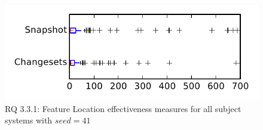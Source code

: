 
\begin{figure}
\centering
\includegraphics[height=0.4\textheight]{figures/flt_seed/rq1_tiny_41}
\caption{RQ 3.3.1: Feature Location effectiveness measures for all subject systems with $seed=41$}
\label{fig:flt_seed:rq1:tiny}
\end{figure}
